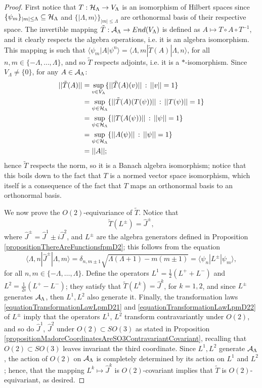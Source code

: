 \begin{proof}
First notice that $T: \mathcal H_\Lambda \to V_\Lambda$ is an isomorphism of Hilbert spaces since $\{\psi_m\}_{|m| \leq \Lambda} \subseteq \mathcal H_\Lambda$ and $\{|\Lambda, m\rangle\}_{|m| \leq \Lambda}$ are orthonormal basis of their respective space. The invertible mapping $\tilde T: \mathcal A_\Lambda \to End(V_\Lambda)$ is defined as $A \mapsto T \circ A \circ T^{-1}$, and it clearly respects the algebra operations, i.e. it is an algebra isomorphism. This mapping is such that $\langle 
\psi_m | A | \psi^n \rangle = \langle \Lambda, m | \tilde T(A) | \Lambda, n\rangle$, for all $n, m \in \{-\Lambda, \dots, \Lambda\}$, and so $\tilde T$ respects adjoints, i.e. it is a $*$-isomorphism. Since $V_\Lambda \neq \{0\}$, for any $A \in \mathcal A_\Lambda$:
\begin{align*}
    ||\tilde T (A)|| &= \sup_{v \in V_\Lambda} \{||\tilde T(A)(v)||\,:\, ||v|| = 1\} \\
    &= \sup_{\psi \in \mathcal H_\Lambda} \{||\tilde T(A)(T(\psi))||\,:\, ||T(\psi)|| = 1\} \\
    &= \sup_{\psi \in \mathcal H_\Lambda} \{||T(A(\psi))||\,:\, ||\psi|| = 1\} \\
    &= \sup_{\psi \in \mathcal H_\Lambda} \{||A(\psi)||\,:\, ||\psi|| = 1\}\\
    &= ||A||;
\end{align*}
hence $\tilde T$ respects the norm, so it is a Banach algebra isomorphism; notice that this boils down to the fact that $T$ is a normed vector space isomorphism, which itself is a consequence of the fact that $T$ maps an orthonormal basis to an orthonormal basis.

We now prove the $O(2)$-equivariance of $\tilde T$. Notice that 
\begin{equation}
    \tilde T(L^\pm) = \hat J^\pm,
\end{equation}
where $\hat J^\pm = \hat J^1 \pm i \hat J^2$, and $L^\pm$ are the algebra generators defined in Proposition \ref{propositionThereAreFunctionsfpmD2}; this follows from the equation 
\[\langle \Lambda, n| \hat J^\pm |\Lambda, m \rangle = \delta_{n, m \pm 1} \sqrt{\Lambda(\Lambda + 1) - m(m \pm 1)} = \langle \psi_n | L^\pm | \psi_m \rangle,\]
for all $n, m \in \{-\Lambda, \dots, \Lambda\}$. Define the operators $L^1 = \frac{1}{2}(L^+ + L^-)$ and $L^2 = \frac{1}{2i}(L^+ - L^-)$; they satisfy that $\tilde T(L^k) = \hat J^k$, for $k = 1, 2$, and since $L^\pm$ generates $\mathcal A_\Lambda$, then $L^1, L^2$ also generate it. Finally, the transformation laws \eqref{equationTransformationLawLpmD21} and \eqref{equationTransformationLawLpmD22} of $L^\pm$ imply that the operators $L^1$, $L^2$ transform contravariantly under $O(2)$, and so do $\hat J^1$, $\hat J^2$ under $O(2) \subset SO(3)$ as stated in Proposition \ref{propositionMadoreCoordinatesAreSO3ContravariantCovariant}, recalling that $O(2) \subset SO(3)$ leaves invariant the third coordinate. Since $L^1, L^2$ generate $\mathcal A_\Lambda$, the action of $O(2)$ on $\mathcal A_\Lambda$ is completely determined by its action on $L^1$ and $L^2$; hence, that the mapping $L^k \mapsto \hat J^k$ is $O(2)$-covariant implies that $\tilde T$ is $O(2)$-equivariant, as desired.


\end{proof}
